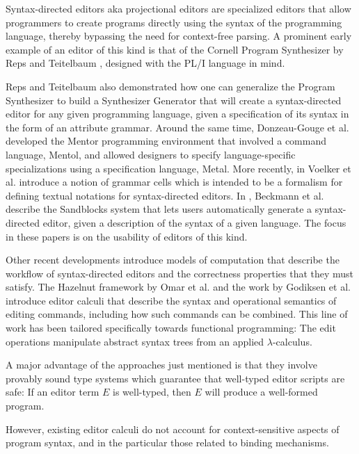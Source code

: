 \documentclass[sigplan]{acmart}
\begin{document}
Syntax-directed editors aka projectional editors are specialized
editors that allow programmers to create programs directly using the
syntax of the programming language, thereby bypassing the need for
context-free parsing. A prominent early example of an editor of this
kind is that of the Cornell Program Synthesizer by Reps and Teitelbaum
\cite{10.1145/358746.358755}, designed with the PL/I language in mind.

Reps and Teitelbaum also demonstrated \cite{10.1145/390010.808247} how
one can generalize the Program Synthesizer to build a Synthesizer
Generator that will create a syntax-directed editor for any given
programming language, given a specification of its syntax in the form
of an attribute grammar. Around the same time, Donzeau-Gouge et
al. developed the Mentor programming environment
\cite{10.5555/800054.801990} that involved a command language, Mentol,
and allowed designers to specify language-specific specializations
using a specification language, Metal. More recently, in
\cite{10.1145/2997364.2997365} Voelker et al. introduce a notion of
grammar cells which is intended to be a formalism for defining textual
notations for syntax-directed editors. In
\cite{10.1145/3544548.3580785}, Beckmann et al. describe the
Sandblocks system that lets users automatically generate a
syntax-directed editor, given a description of the syntax of a given
language. The focus in these papers is on the usability of editors of
this kind.

Other recent developments introduce models of computation that
describe the workflow of syntax-directed editors and the correctness
properties that they must satisfy. The Hazelnut framework by Omar et
al. \cite{hazelnut} and the work by Godiksen et al. 
\cite{type_safe_structure_editor} introduce editor calculi that
describe the syntax and operational semantics of editing commands,
including how such commands can be combined. This line of work has
been tailored specifically towards functional programming: The edit
operations manipulate abstract syntax trees from an applied
$\lambda$-calculus.

A major advantage of the approaches just mentioned is that they
involve provably sound type systems which guarantee that well-typed
editor scripts are safe: If an editor term $E$ is well-typed, then $E$
will produce a well-formed program.

However, existing editor calculi do not account for context-sensitive
aspects of program syntax, and in the particular those related to
binding mechanisms.
\end{document}
